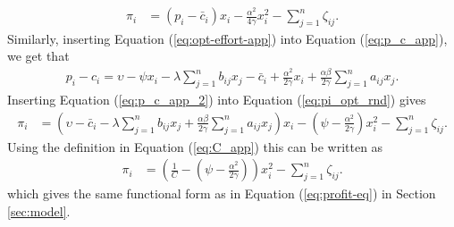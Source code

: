 \begin{align}
\pi_i & = (p_i-\bar{c}_i) x_i - \frac{\alpha^2}{4 \gamma} x_i^2 - \sum_{j=1}^n \zeta_{ij}. 
\label{eq:pi_opt_rnd}
\end{align}
Similarly, inserting Equation (\ref{eq:opt-effort-app}) into Equation (\ref{eq:p_c_app}), we get that
\begin{align}
p_i-c_i =  \upsilon - \psi x_i - \lambda \sum_{j=1}^n b_{ij} x_j - \bar{c}_i + \frac{\alpha^2}{2 \gamma} x_i + \frac{\alpha \beta}{2 \gamma} \sum_{j=1}^n a_{ij} x_j. 
\label{eq:p_c_app_2}
\end{align}
Inserting Equation (\ref{eq:p_c_app_2}) into Equation (\ref{eq:pi_opt_rnd}) gives
\begin{align*}
\pi_i & = \left(
\upsilon - \bar{c}_i
 - \lambda \sum_{j=1}^n b_{ij} x_j + \frac{\alpha \beta}{2 \gamma} \sum_{j=1}^n a_{ij} x_j
 \right) x_i - \left(\psi - \frac{\alpha^2}{2 \gamma}\right) x_i^2 - \sum_{j=1}^n \zeta_{ij}. 
\end{align*}
Using the definition in Equation (\ref{eq:C_app}) this can be written as
\begin{align*}
\pi_i & =  \left(\frac{1}{C}-\left(\psi - \frac{\alpha^2}{2 \gamma}\right)\right) x_i^2
- \sum_{j=1}^n \zeta_{ij}. 
\end{align*}
which gives the same functional form as in Equation (\ref{eq:profit-eq}) in Section \ref{sec:model}.

